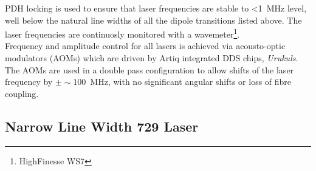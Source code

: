     PDH locking is used to ensure that laser frequencies are stable to <1~MHz level, well below the natural line widths of all the dipole transitions listed above. The laser frequencies are continuosly monitored with a wavemeter\footnote{HighFinesse WS7}.\\
    Frequency and amplitude control for all lasers is achieved via acousto-optic modulators (AOMs) which are driven by Artiq integrated DDS chips, \emph{Urukuls}. The AOMs are used in a double pass configuration to allow shifts of the laser frequency by $\pm \sim 100$~MHz, with no significant angular shifts or loss of fibre coupling. 
    
    
\subsection{Narrow Line Width 729 Laser}
\label{sec:Narrow Line Width 729 Laser} 

